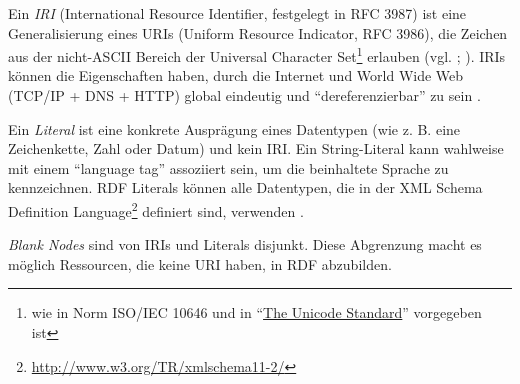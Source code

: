 \documentclass[../main.tex]{subfiles}
\begin{document}
Ein \textit{IRI} (International Resource Identifier, festgelegt in RFC 3987) ist eine Generalisierung eines URIs (Uniform Resource Indicator, RFC 3986), die Zeichen aus der nicht-ASCII Bereich der Universal Character Set\footnote{wie in Norm ISO/IEC 10646 und in \hyphenquote{german}{\href{http://www.unicode.org/versions/latest}{The Unicode Standard}} vorgegeben ist} erlauben (vgl. \cite[][Abs~3.2]{Schreiber:14:RP}; \cite[]{rfc3987}). IRIs können die Eigenschaften haben, durch die Internet und World Wide Web (TCP/IP + DNS + HTTP) global eindeutig und \hyphenquote{german}{dereferenzierbar} zu sein \autocite[vgl.][Abs.~2]{Jacobs:04:AWW}. 

Ein \textit{Literal} ist eine konkrete Ausprägung eines Datentypen (wie z. B. eine Zeichenkette, Zahl oder Datum) und kein IRI. Ein String-Literal kann wahlweise mit einem \hyphenquote{german}{language tag} assoziiert sein, um die beinhaltete Sprache zu kennzeichnen. RDF Literals können alle Datentypen, die in der XML Schema Definition Language\footnote{\url{http://www.w3.org/TR/xmlschema11-2/}} definiert sind, verwenden \autocite[vgl.][Abs. 5]{Wood:14:RCA}. 

\textit{Blank Nodes} sind von IRIs und Literals disjunkt. Diese Abgrenzung macht es möglich Ressourcen, die keine URI haben, in RDF abzubilden. 
\end{document}
